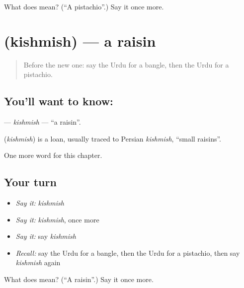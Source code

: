 \begin{tcolorbox}[breakable,colback=teal!4,colframe=teal!35!black,title={Before you move on}]
What does  mean? (\textquotedblleft{}A pistachio\textquotedblright{}.) Say it once more.
\end{tcolorbox}
\section[\texorpdfstring{\ur{کشمش} (kishmish)}{کشمش (kishmish)}]{ (kishmish) — a raisin}

\label{lesson:UR-C167-kishmish}



\begin{quote}
Before the new one: say the Urdu for a bangle, then the Urdu for a pistachio.
\end{quote}

\subsection*{You'll want to know: }
\textbf{} — \emph{kishmish} — \textquotedblleft{}a raisin\textquotedblright{}.

\begin{cousinweb}
\textbf{} (\emph{kishmish}) is a loan, usually traced to Persian \emph{kishmish}, \textquotedblleft{}small raisins\textquotedblright{}.
\end{cousinweb}

\begin{grammarlens}[title={What you've built}]
One more word for this chapter.
\end{grammarlens}

\subsection*{Your turn}
\begin{itemize}
\raggedright
  \item \emph{Say it:} \emph{kishmish}
  \item \emph{Say it:} \emph{kishmish}, once more
  \item \emph{Say it:} say \emph{kishmish}
  \item \emph{Recall:} say the Urdu for a bangle, then the Urdu for a pistachio, then say \emph{kishmish} again
\end{itemize}

\begin{tcolorbox}[breakable,colback=teal!4,colframe=teal!35!black,title={Before you move on}]
What does  mean? (\textquotedblleft{}A raisin\textquotedblright{}.) Say it once more.
\end{tcolorbox}
